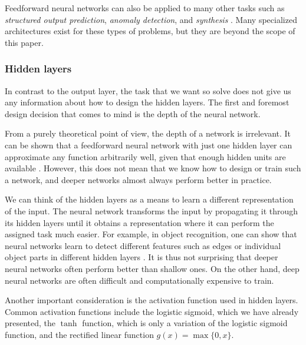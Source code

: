 Feedforward neural networks can also be applied to many other tasks such as \emph{structured output prediction}, \emph{anomaly detection}, and \emph{synthesis} \cite[Ch.\,5,\,pp.\,96-100]{DBLP:books/daglib/0040158}. Many specialized architectures exist for these types of problems, but they are beyond the scope of this paper.
\subsubsection{Hidden layers}
In contrast to the output layer, the task that we want so solve does not give us any information about how to design the hidden layers. The first and foremost design decision that comes to mind is the depth of the neural network. 

From a purely theoretical point of view, the depth of a network is irrelevant. It can be shown that a feedforward neural network with just one hidden layer can approximate any function arbitrarily well, given that enough hidden units are available \cite{DBLP:journals/nn/HornikSW89,DBLP:journals/mcss/Cybenko89}. However, this does not mean that we know how to design or train such a network, and deeper networks almost always perform better in practice.

We can think of the hidden layers as a means to learn a different representation of the input. The neural network transforms the input by propagating it through its hidden layers until it obtains a representation where it can perform the assigned task much easier. For example, in object recognition, one can show that neural networks learn to detect different features such as edges or individual object parts in different hidden layers \cite{DBLP:conf/eccv/ZeilerF14}. It is thus not surprising that deeper neural networks often perform better than shallow ones. On the other hand, deep neural networks are often difficult and computationally expensive to train.

Another important consideration is the activation function used in hidden layers. Common activation functions include the logistic sigmoid, which we have already presented, the $\tanh$ function, which is only a variation of the logistic sigmoid function, and the rectified linear function $g(x) = \max\{0,x\}$.

\begin{comment}
\begin{figure}
	\begin{center}
		
	\end{center}
	\caption{The rectified linear function.}
	\label{fig:relu}
\end{figure}
\end{comment}

